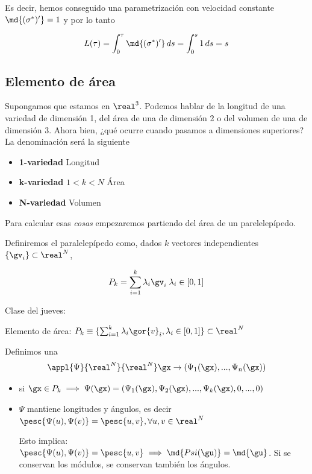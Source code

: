 Es decir, hemos conseguido una parametrización con velocidad constante $\md{(\sigma^\ast)'} = 1$ y por lo tanto

\[ L(\tau) = \int_0^\tau \md{(\sigma^\ast)'}\,ds = \int_0^s 1\,ds = s \]

\subsection{Elemento de área}

Supongamos que estamos en $\real^3$. Podemos hablar de la longitud de una variedad de dimensión 1, del área de una de dimensión 2 o del volumen de una de dimensión 3. Ahora bien, ¿qué ocurre cuando pasamos a dimensiones superiores? La denominación será la siguiente

\begin{itemize}
\item \textbf{1-variedad} Longitud
\item \textbf{k-variedad} $1<k<N$ Área
\item \textbf{N-variedad} Volumen
\end{itemize}

Para calcular esas \textit{cosas} empezaremos partiendo del área de un parelelepípedo.

Definiremos el paralelepípedo como, dados $k$ vectores independientes $\{\gv_i\} \subset \real^N$, 

\[ P_k = \sum_{i=1}^k \lambda_i\gv_i\;\lambda_i \in [0,1] \]

Clase del jueves:


Elemento de área: $P_k \equiv \{ \sum_{i=1}^k \lambda_i\gor{v}_i, \lambda_i \in [0,1]\}\subset \real^N$

Definimos una \begin{gather*}
\appl{\Psi}{\real^N}{\real^N}
\gx \rightarrow (\Psi_1(\gx),...,\Psi_n(\gx))
\end{gather*}

\begin{itemize}
\item si $\gx \in P_k \implies \Psi(\gx) = (\Psi_1(\gx),\Psi_2(\gx),...,\Psi_k(\gx),0,...,0)$
\item $\Psi$ mantiene longitudes y ángulos, es decir $\pesc{\Psi(u),\Psi(v)}=\pesc{u,v}, \forall u,v\in\real^N$

Esto implica: $\pesc{\Psi(u),\Psi(v)}=\pesc{u,v} \implies \md{Psi(\gu)} = \md{\gu}$. Si se conservan los módulos, se conservan también los ángulos.
\end{itemize}

